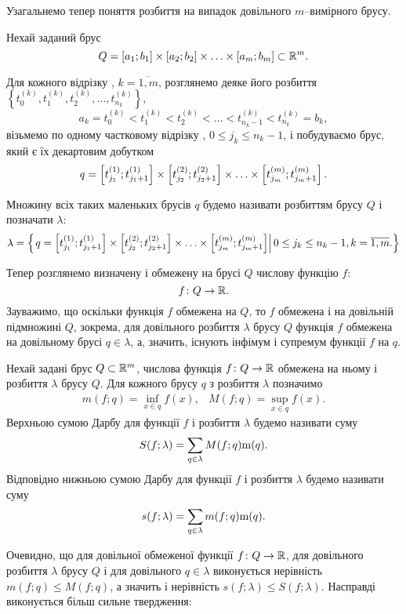 Узагальнемо тепер поняття розбиття на випадок довільного $m$--вимірного брусу.

\begin{definition}
Нехай заданий брус
\[
Q = [a_1;b_1]\times[a_2;b_2]\times\ldots\times[a_m;b_m] \subset \mathbb{R}^{m}.
\]

Для кожного відрізку , ${k=\overline{1,m}}$, розглянемо деяке його розбиття ${\left\{t_0^{(k)}, t_1^{(k)}, t_2^{(k)}, \ldots, t_{n_k}^{(k)}\right\}}$,
\[
a_k = t_0^{(k)} < t_1^{(k)} < t_2^{(k)} < \ldots  < t_{n_k-1}^{(k)} < t_{n_k}^{(k)} = b_k,
\]
візьмемо по одному частковому відрізку , ${0 \leq j_k \leq n_k - 1}$, і побудуваємо брус, який є їх декартовим добутком
\[
q = \left[t^{(1)}_{j_1};t^{(1)}_{j_1+1}\right]\times\left[t^{(2)}_{j_2};t^{(2)}_{j_2+1}\right]\times\ldots\times\left[t^{(m)}_{j_m};t^{(m)}_{j_m+1}\right].
\]

Множину всіх таких маленьких брусів $q$ будемо називати розбиттям брусу $Q$ і позначати ${\lambda}$:
\[
\lambda = \left\{\left. q=\left[t^{(1)}_{j_1};t^{(1)}_{j_1+1}\right]\times\left[t^{(2)}_{j_2};t^{(2)}_{j_2+1}\right]\times\ldots\times\left[t^{(m)}_{j_m};t^{(m)}_{j_m+1}\right]\right|  0 \leq j_k \leq n_k - 1, k=\overline{1,m}. \right\}
\]
\end{definition}
Тепер розглянемо визначену і обмежену на брусі $Q$ числову функцію $f$:
\[
f\colon Q \to \mathbb{R}.
\]
Зауважимо, що оскільки функція $f$ обмежена на $Q$, то $f$ обмежена і на довільній підмножині $Q$, зокрема, для довільного розбиття $\lambda$ брусу $Q$ функція $f$ обмежена на довільному брусі ${q \in \lambda}$, а, значить, існують інфімум і супремум функції $f$ на $q$.
\begin{definition}
Нехай задані брус ${Q\subset\mathbb{R}^{m}}$, числова функція ${f\colon Q \to \mathbb{R}}$ обмежена на ньому і розбиття $\lambda$ брусу $Q$. Для кожного брусу $q$ з розбиття $\lambda$ позначимо
\[
\begin{array}{cc}
m(f;q) = \inf\limits_{x\in q} f(x), & M(f;q) = \sup\limits_{x\in q} f(x).
\end{array}
\]
Верхньою сумою Дарбу для функції $f$ і розбиття $\lambda$ будемо називати суму
\[
S(f;\lambda) = \sum\limits_{q\in \lambda} M(f;q) \mathrm{m}(q).
\]
Відповідно нижньою сумою Дарбу  для функції $f$ і розбиття $\lambda$ будемо називати суму
\[
s(f;\lambda) = \sum\limits_{q\in \lambda} m(f;q) \mathrm{m}(q).
\]
\end{definition}

Очевидно, що для довільної обмеженої функції ${f\colon Q \to \mathbb{R}}$, для довільного розбиття $\lambda$ брусу $Q$ і для довільного ${q \in \lambda}$ виконується нерівність ${m(f;q) \leq M(f;q)}$, а значить і нерівність ${s(f; \lambda) \leq S(f;\lambda)}$. Насправді виконується більш сильне твердження:

